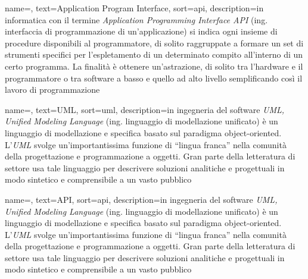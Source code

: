 
\renewcommand{\acronymname}{Acronimi e abbreviazioni}




{
    name=,
    text=Application Program Interface,
    sort=api,
    description={in informatica con il termine \emph{Application Programming Interface API} (ing. interfaccia di programmazione di un'applicazione) si indica ogni insieme di procedure disponibili al programmatore, di solito raggruppate a formare un set di strumenti specifici per l'espletamento di un determinato compito all'interno di un certo programma. La finalità è ottenere un'astrazione, di solito tra l'hardware e il programmatore o tra software a basso e quello ad alto livello semplificando così il lavoro di programmazione}
}

{
    name=,
    text=UML,
    sort=uml,
    description={in ingegneria del software \emph{UML, Unified Modeling Language} (ing. linguaggio di modellazione unificato) è un linguaggio di modellazione e specifica basato sul paradigma object-oriented. L'\emph{UML} svolge un'importantissima funzione di ``lingua franca'' nella comunità della progettazione e programmazione a oggetti. Gran parte della letteratura di settore usa tale linguaggio per descrivere soluzioni analitiche e progettuali in modo sintetico e comprensibile a un vasto pubblico}
}

{
    name=,
    text=API,
    sort=api, 
    description={in ingegneria del software \emph{UML, Unified Modeling Language} (ing. linguaggio di modellazione unificato) è un linguaggio di modellazione e specifica basato sul paradigma object-oriented. L'\emph{UML} svolge un'importantissima funzione di ``lingua franca'' nella comunità della progettazione e programmazione a oggetti. Gran parte della letteratura di settore usa tale linguaggio per descrivere soluzioni analitiche e progettuali in modo sintetico e comprensibile a un vasto pubblico}
}

